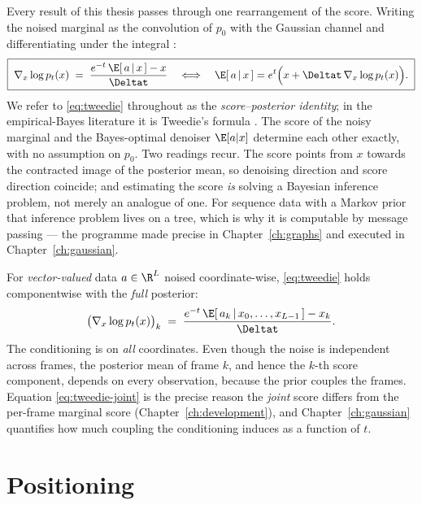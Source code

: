 Every result of this thesis passes through one rearrangement of the score.
Writing the noised marginal as the convolution of $p_0$ with the Gaussian
channel and differentiating under the integral
\citep{vincent2011connection}:
\begin{equation}
  \boxed{\;
  \nabla_x \log p_t(x)
  \;=\; \frac{e^{-t}\,\E[\,a \,|\, x\,] - x}{\Deltat}
  \quad\Longleftrightarrow\quad
  \E[\,a \,|\, x\,]
  = e^{t} \Big( x + \Deltat\, \nabla_x \log p_t(x) \Big).
  \;}
  \label{eq:tweedie}
\end{equation}
We refer to \eqref{eq:tweedie} throughout as the \emph{score--posterior
identity}; in the empirical-Bayes literature it is Tweedie's formula
\citep{robbins1956empirical, miyasawa1961empirical, efron2011tweedie}. The
score of the noisy marginal and the Bayes-optimal denoiser $\E[a|x]$ determine
each other exactly, with no assumption on $p_0$. Two readings recur. The score
points from $x$ towards the contracted image of the posterior mean, so denoising
direction and score direction coincide; and estimating the score \emph{is}
solving a Bayesian inference problem, not merely an analogue of one. For
sequence data with a Markov prior that inference problem lives on a tree, which
is why it is computable by message passing --- the programme made precise in
Chapter~\ref{ch:graphs} and executed in Chapter~\ref{ch:gaussian}.

For \emph{vector-valued} data $a \in \R^{L}$ noised coordinate-wise,
\eqref{eq:tweedie} holds componentwise with the \emph{full} posterior:
\begin{equation}
  \big( \nabla_x \log p_t(x) \big)_k
  \;=\; \frac{e^{-t}\, \E[\,a_k \,|\, x_0, \dots, x_{L-1}\,] - x_k}{\Deltat}.
  \label{eq:tweedie-joint}
\end{equation}
The conditioning is on \emph{all} coordinates. Even though the noise is
independent across frames, the posterior mean of frame $k$, and hence the $k$-th
score component, depends on every observation, because the prior couples the
frames. Equation \eqref{eq:tweedie-joint} is the precise reason the \emph{joint}
score differs from the per-frame marginal score
(Chapter~\ref{ch:development}), and Chapter~\ref{ch:gaussian} quantifies how
much coupling the conditioning induces as a function of $t$.

\section{Positioning}\label{sec:gap}\label{sec:related}

